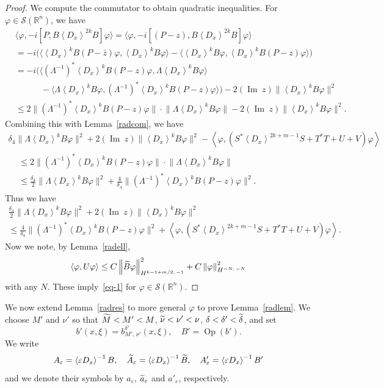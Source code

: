 \documentclass[AHL,Unicode,longabstracts,published]{cedram}
\renewcommand*\d{\delta}
\newcommand*\e{\varepsilon}
\newcommand*\f{\varphi}
\newcommand*\n{\nu}
\newcommand*\x{\xi}
\renewcommand{\L}{\Lambda}
\DeclareMathOperator{\Op}{Op}
\newcommand*\re{\mathbb{R}}
\newcommand{\clS}{\mathcal{S}}
\DeclareMathOperator{\Iml}{Im\;}
\newcommand{\jap}[1]{\left\langle #1 \right\rangle}
\newcommand{\norm}[1]{\left\| #1 \right\|}
\newcommand{\bignorm}[1]{\bigl\| #1 \bigr\|}
\newcommand{\bigpare}[1]{\bigl(#1\bigr)}
\newcommand{\bigjap}[1]{\bigl\langle #1 \bigr\rangle}
\let\oldtilde\tilde
\renewcommand*{\tilde}[1]{\mathchoice{\widetilde{#1}}{\widetilde{#1}}{\oldtilde{#1}}{\oldtilde{#1}}}
\begin{document}
\begin{proof}
We compute the commutator to obtain quadratic inequalities. For $\f\in\clS(\re^n)$, we have
\begin{align*}
&\bigjap{\f,-i\left[P,B\jap{D_x}^{2k}B\right]\f} = \bigjap{\f,-i\left[(P-z),B\jap{D_x}^{2k}B\right]\f} \\
&= -i \bigpare{\bigjap{\jap{D_x}^k B(P-\bar z)\f,\jap{D_x}^k B\f} -\bigjap{\jap{D_x}^k B\f, \jap{D_x}^k B (P-z)\f}} \\
&= -i \bigpare{\bigjap{(\L^{-1})^*\jap{D_x}^k B(P-z)\f,\L\jap{D_x}^k B\f}\\
&\qquad\quad -\bigjap{\L\jap{D_x}^k B\f, (\L^{-1})^*\jap{D_x}^k B (P-z)\f}} -2(\Iml z)\bignorm{\jap{D_x}^k B\f}^2\\
&\leq 2\bignorm{(\L^{-1})^* \jap{D_x}^k B (P-z)\f}\cdot\bignorm{\L \jap{D_x}^k B\f} -2(\Iml z)\bignorm{\jap{D_x}^k B\f}^2.
\end{align*}
Combining this with Lemma~\ref{radcom}, we have
\begin{multline*}
\d_4\bignorm{\L\jap{D_x}^k B\f}^2 +2(\Iml z)\bignorm{\jap{D_x}^k B\f}^2
- \jap{\f,(S^*\jap{D_x}^{2k+m-1}S+T^*T+U+V)\f} \\
\begin{aligned}
&\leq 2\bignorm{(\L^{-1})^* \jap{D_x}^k B (P-z)\f}\cdot\bignorm{\L \jap{D_x}^k B\f}\\
&\leq \frac{\d_4}{2}\bignorm{\L \jap{D_x}^k B\f}^2 +\frac{4}{\d_4} \bignorm{(\L^{-1})^* \jap{D_x}^k B (P-z)\f}^2.
\end{aligned}
\end{multline*}
Thus we have
\begin{multline*}
\frac{\d_4}{2}\bignorm{\L \jap{D_x}^k B\f}^2 + 2(\Iml z)\bignorm{\jap{D_x}^k B\f}^2\\
\leq \frac{4}{\d_4} \bignorm{(\L^{-1})^* \jap{D_x}^k B (P-z)\f}^2
+\jap{\f,(S^*\jap{D_x}^{2k+m-1}S+T^*T+U+V)\f}.
\end{multline*}
Now we note, by Lemma~\ref{radell},
\[
\jap{\f,U\f} \leq C\norm{\tilde B\f}_{H^{k-1+m/2,\,-1}}^2 +C\norm{\f}_{H^{-N,\,-N}}^2
\]
with any $N$. These imply~\eqref{eq-1} for $\f\in\clS(\re^n)$.
\end{proof}

We now extend Lemma~\ref{radres} to more general $\f$ to prove Lemma~\ref{radlem}. We choose $M'$ and $\n'$ so that $\tilde M<M'<M$, $\tilde \n<\n'<\n$, $\d<\d'<\tilde\d$, and set
\[
b'(x,\x)=b^{\d'}_{M',\,\n'}(x,\x), \quad B'=\Op(b').
\]
We write
\[
A_\e= \jap{\e D_x}^{-1} B, \quad \tilde A_\e= \jap{\e D_x}^{-1} \tilde B, \quad A'_\e= \jap{\e D_x}^{-1} B'
\]
and we denote their symbols by $a_\e$, $\tilde a_\e$ and $a'_\e$, respectively.
\end{document}
